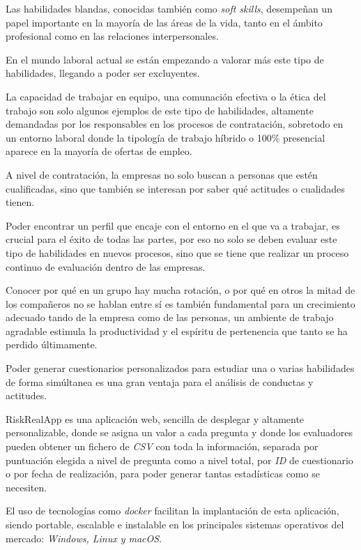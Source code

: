 
Las habilidades blandas, conocidas también como \textit{soft skills}, desempeñan un papel importante en la mayoría de las áreas de la vida, tanto en el ámbito profesional como en las relaciones interpersonales.

En el mundo laboral actual se están empezando a valorar más este tipo de habilidades, llegando a poder ser excluyentes. 

La capacidad de trabajar en equipo, una comunación efectiva o la ética del trabajo son solo algunos ejemplos de este tipo de habilidades, altamente demandadas por los responsables en los procesos de contratación, sobretodo en un entorno laboral donde la tipología de trabajo híbrido o 100\% presencial aparece en la mayoría de ofertas de empleo.

A nivel de contratación, la empresas no solo buscan a personas que estén cualificadas, sino que también se interesan por saber qué actitudes o cualidades tienen.

Poder encontrar un perfil que encaje con el entorno en el que va a trabajar, es crucial para el éxito de todas las partes, por eso no solo se deben evaluar este tipo de habilidades en nuevos procesos, sino que se tiene que realizar un proceso continuo de evaluación dentro de las empresas.

Conocer por qué en un grupo hay mucha rotación, o por qué en otros la mitad de los compañeros no se hablan entre sí es también fundamental para un crecimiento adecuado tando de la empresa como de las personas, un ambiente de trabajo agradable estimula la productividad y el espíritu de pertenencia que tanto se ha perdido últimamente.

Poder generar cuestionarios personalizados para estudiar una o varias habilidades de forma simúltanea es una gran ventaja para el análisis de conductas y actitudes.

RiskRealApp es una aplicación web, sencilla de desplegar y altamente personalizable, donde se asigna un valor a cada pregunta y donde los evaluadores pueden obtener un fichero de \textit{CSV} con toda la información, separada por puntuación elegida a nivel de pregunta como a nivel total, por \textit{ID} de cuestionario o por fecha de realización, para poder generar tantas estadísticas como se necesiten.

El uso de tecnologías como \textit{docker} facilitan la implantación de esta aplicación, siendo portable, escalable e instalable en los principales sistemas operativos del mercado: \textit{Windows, Linux y macOS}.

